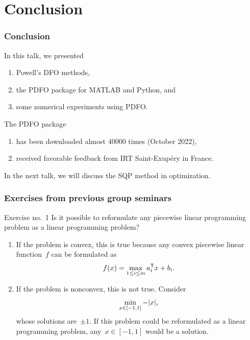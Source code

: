 \documentclass{polyu-presentation}
\newcommand{\obj}{f}
\begin{document}
\section{Conclusion}

\begin{frame}
    \frametitle{Conclusion}
    
    In this talk, we presented
    \begin{enumerate}
        \item \alert{Powell's DFO methods},
        \item the \alert{PDFO} package for MATLAB and Python, and
        \item some \alert{numerical experiments} using PDFO.
    \end{enumerate}

    \bigskip

    The PDFO package
    \begin{enumerate}
        \item has been \alert{downloaded} almost \num{40000} times (October 2022),
        \item received \alert{favorable feedback} from IRT Saint-Exup{\'{e}}ry in France.
    \end{enumerate}

    \bigskip

    In the next talk, we will discuss the \alert{SQP method} in optimization.
\end{frame}

\appendix

\begin{frame}
    \frametitle{Exercises from previous group seminars}

    \begin{block}{Exercise no.\ 1}
        Is it possible to \alert{reformulate} any \alert{piecewise linear programming} problem as a \alert{linear programming} problem?
    \end{block}

    \smallskip

    \begin{enumerate}
        \item If the problem is \alert{convex}, this is \alert{true} because any convex piecewise linear function~$\obj$ can be formulated as
        \begin{equation*}
            \obj(x) = \max_{1 \le i \le m} a_i^{\T} x + b_i.
        \end{equation*}
        \item If the problem is \alert{nonconvex}, this is \alert{not true}.
        Consider
        \begin{equation*}
            \min_{x \in [-1, 1]} -\lvert x\rvert,
        \end{equation*}
        whose solutions are~$\pm 1$.
        If this problem could be reformulated as a linear programming problem, any~$x \in [-1, 1]$ would be a solution.
    \end{enumerate}
\end{frame}
\end{document}
